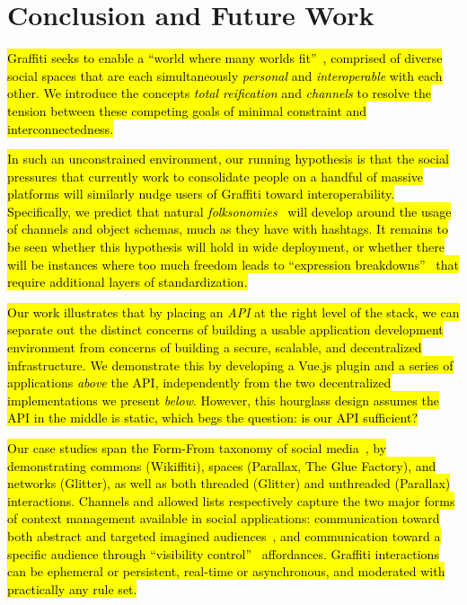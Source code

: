 \section{Conclusion and Future Work}

\hl{%
Graffiti seeks to enable a ``world where many worlds fit''~{\cite{escobarpluriverse}},
comprised of diverse social spaces that are each simultaneously \emph{personal}
and \emph{interoperable} with each other.
We introduce the concepts \emph{total reification} and \emph{channels}
to resolve the tension between these competing goals
of minimal constraint and interconnectedness.
}%

\hl{%
In such an unconstrained environment,
our running hypothesis is
that the social pressures that currently work
to consolidate people on a handful of massive platforms
will similarly nudge users of Graffiti toward interoperability.
Specifically, we predict that natural \emph{folksonomies}~{\cite{folksonomy}} will
develop around the usage of channels and object schemas, much as they have with hashtags.
It remains to be seen whether this hypothesis will hold in wide deployment,
or whether there will be instances where too much freedom leads to
``expression breakdowns''~{\cite{expressionbreakdowns}}
that require additional layers of standardization.
}%

\hl{%
Our work illustrates that by placing an \emph{API}
at the right level of the stack, we can separate out the distinct concerns
of building a usable application development environment
from concerns of building a secure, scalable, and decentralized infrastructure.
We demonstrate this by developing a Vue.js plugin and a series
of applications \emph{above} the API, independently from the
two decentralized implementations we present \emph{below}.
However, this hourglass design assumes the API in the middle is static,
which begs the question: is our API sufficient?
}%

\hl{%
Our case studies span the Form-From taxonomy of social media~{\cite{formfrom}},
by demonstrating commons (Wikiffiti), spaces (Parallax, The Glue Factory), and networks (Glitter),
as well as both threaded (Glitter) and unthreaded (Parallax) interactions.
Channels and allowed lists respectively capture the two major
forms of context management available in social applications:
communication toward both abstract and targeted imagined audiences~{\cite{imaginedaudience}},
and communication toward a specific audience through ``visibility control''~{\cite{visibilitycontrol}} affordances.
Graffiti interactions can be ephemeral or persistent, real-time or asynchronous,
and moderated with practically any rule set.
}%

